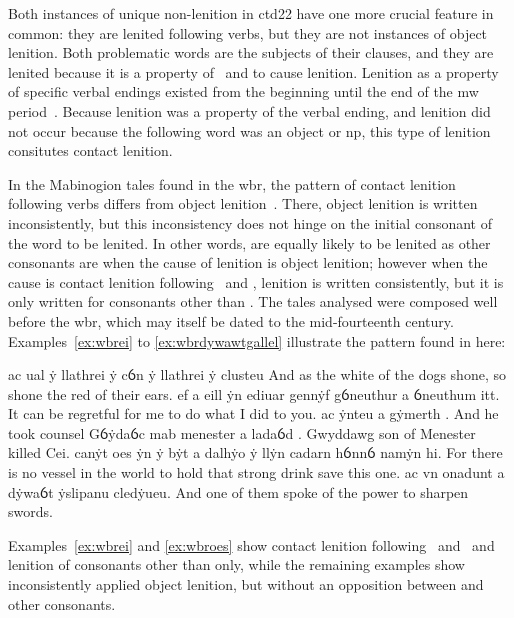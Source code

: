 Both instances of unique non-lenition in \gls{ctd22} have one more crucial feature in common: they are lenited following verbs, but they are not instances of object lenition. Both problematic words are the subjects of their clauses, and they are lenited because it is a property of \ei\ and  to cause lenition. Lenition as a property of specific verbal endings existed from the beginning until the end of the \gls{mw} period~\autocite[42]{van_development14}. Because lenition was a property of the verbal ending, and lenition did not occur because the following word was an object or \gls{np}, this type of lenition consitutes contact lenition.

In the Mabinogion tales found in the \gls{wbr}, the pattern of contact lenition following verbs differs from object lenition~\autocite[42, 69--70]{van_development14}. There, object lenition is written inconsistently, but this inconsistency does not hinge on the initial consonant of the word to be lenited. In other words,  are equally likely to be lenited  as other consonants are when the cause of lenition is object lenition; however when the cause is contact lenition following \ei\ and \oes, lenition is written consistently, but it is only written for consonants other than . The tales analysed were composed well before the \gls{wbr}, which may itself be dated to the mid-fourteenth century. Examples~\ref{ex:wbrei} to \ref{ex:wbrdywawtgallel} illustrate the pattern found in here:
\begin{mwl}
  {ac ual ẏ llathrei  ẏ cỽn ẏ llathrei  ẏ clusteu}%
  {And as the white of the dogs shone, so shone the red of their ears.}%
  {ef a eill  ẏn ediuar gennẏf gỽneuthur a ỽneuthum itt.}%
  {It can be regretful for me to do what I did to you.}
  {ac ẏnteu a gẏmerth .}%
  {And he took counsel}
  {Gỽẏdaỽc mab menester a ladaỽd .}%
  {Gwyddawg son of Menester killed Cei.}
  {canẏt oes  ẏn ẏ bẏt a dalhẏo ẏ llẏn cadarn hỽnnỽ namẏn hi.}%
  {For there is no vessel in the world to hold that strong drink save this one.}%
  {ac vn onadunt a dẏwaỽt  ẏslipanu cledẏueu.}%
  {And one of them spoke of the power to sharpen swords.}
\end{mwl}
Examples~\ref{ex:wbrei} and \ref{ex:wbroes} show contact lenition following \ei\ and \oes\ and lenition of consonants other than  only, while the remaining examples show inconsistently applied object lenition, but without an opposition between  and other consonants.

